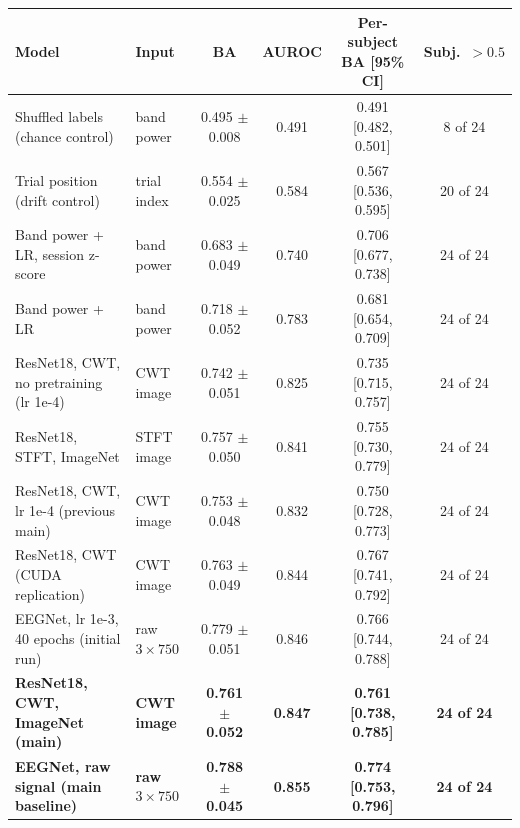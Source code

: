 \begin{tabular}{@{}llcccc@{}}
\toprule
Model & Input & BA & AUROC & Per-subject BA [95\% CI] & Subj.\ $>0.5$ \\
\midrule
Shuffled labels (chance control) & band power & 0.495 $\pm$ 0.008 & 0.491 & 0.491 [0.482, 0.501] & 8 of 24 \\
Trial position (drift control) & trial index & 0.554 $\pm$ 0.025 & 0.584 & 0.567 [0.536, 0.595] & 20 of 24 \\
\midrule
Band power + LR, session z-score & band power & 0.683 $\pm$ 0.049 & 0.740 & 0.706 [0.677, 0.738] & 24 of 24 \\
Band power + LR & band power & 0.718 $\pm$ 0.052 & 0.783 & 0.681 [0.654, 0.709] & 24 of 24 \\
\midrule
ResNet18, CWT, no pretraining (lr 1e-4) & CWT image & 0.742 $\pm$ 0.051 & 0.825 & 0.735 [0.715, 0.757] & 24 of 24 \\
ResNet18, STFT, ImageNet & STFT image & 0.757 $\pm$ 0.050 & 0.841 & 0.755 [0.730, 0.779] & 24 of 24 \\
\midrule
ResNet18, CWT, lr 1e-4 (previous main) & CWT image & 0.753 $\pm$ 0.048 & 0.832 & 0.750 [0.728, 0.773] & 24 of 24 \\
ResNet18, CWT (CUDA replication) & CWT image & 0.763 $\pm$ 0.049 & 0.844 & 0.767 [0.741, 0.792] & 24 of 24 \\
EEGNet, lr 1e-3, 40 epochs (initial run) & raw $3\times750$ & 0.779 $\pm$ 0.051 & 0.846 & 0.766 [0.744, 0.788] & 24 of 24 \\
\midrule
\textbf{ResNet18, CWT, ImageNet (main)} & \textbf{CWT image} & \textbf{0.761 $\pm$ 0.052} & \textbf{0.847} & \textbf{0.761 [0.738, 0.785]} & \textbf{24 of 24} \\
\textbf{EEGNet, raw signal (main baseline)} & \textbf{raw $3\times750$} & \textbf{0.788 $\pm$ 0.045} & \textbf{0.855} & \textbf{0.774 [0.753, 0.796]} & \textbf{24 of 24} \\
\bottomrule
\end{tabular}

